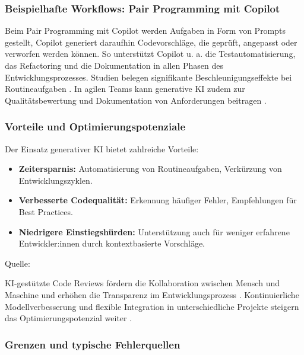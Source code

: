 \subsubsection{Beispielhafte Workflows: Pair Programming mit Copilot}

Beim Pair Programming mit Copilot werden Aufgaben in Form von Prompts gestellt,
Copilot generiert daraufhin Codevorschläge, die geprüft, angepasst oder
verworfen werden können. So unterstützt Copilot u. a. die Testautomatisierung,
das Refactoring und die Dokumentation in allen Phasen des
Entwicklungsprozesses. Studien belegen signifikante Beschleunigungseffekte bei
Routineaufgaben \cite{kerr_github_nodate, weisz_design_2024,
    shi_ai-assisted_2023}. In agilen Teams kann generative KI zudem zur
Qualitätsbewertung und Dokumentation von Anforderungen beitragen
\cite{geyer_case_2025}.

\subsubsection{Vorteile und Optimierungspotenziale}

Der Einsatz generativer KI bietet zahlreiche Vorteile:
\begin{itemize}
    \item \textbf{Zeitersparnis:} Automatisierung von Routineaufgaben, Verkürzung von Entwicklungszyklen.
    \item \textbf{Verbesserte Codequalität:} Erkennung häufiger Fehler, Empfehlungen für Best Practices.
    \item \textbf{Niedrigere Einstiegshürden:} Unterstützung auch für weniger erfahrene Entwickler:innen durch kontextbasierte Vorschläge.
\end{itemize}
Quelle: \cite{donvir_role_2024, sergeyuk_human-ai_2025}

KI-gestützte Code Reviews fördern die Kollaboration zwischen Mensch und
Maschine und erhöhen die Transparenz im Entwicklungsprozess
\cite{alami_human_2025}. Kontinuierliche Modellverbesserung und flexible
Integration in unterschiedliche Projekte steigern das Optimierungspotenzial
weiter \cite{kerr_github_nodate, weisz_design_2024}.

\subsubsection{Grenzen und typische Fehlerquellen}

